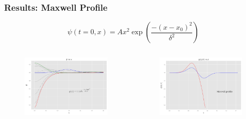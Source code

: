 \documentclass[hyperref={bookmarks=false},aspectratio=169]{beamer}
\begin{document}
\begin{frame}
    \frametitle{Results: Maxwell Profile}

    \begin{equation*}
        \psi(t=0, x)=A x^{2} \exp \left(\frac{-\left(x-x_{0}\right)^{2}}{\delta^{2}}\right)
    \end{equation*}

    \begin{columns}
        \begin{figure}
            \centering
            \includegraphics[width=1\linewidth]{images/super_mod.pdf}
        \end{figure}
        \begin{figure}
            \centering
            \includegraphics[width=1\linewidth]{images/at0_mod.pdf}
        \end{figure}
    \end{columns}

\end{frame}
\end{document}
